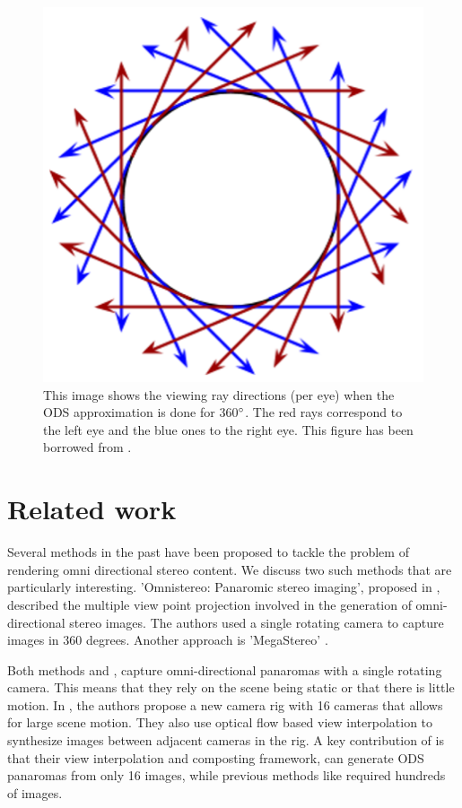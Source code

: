 \documentclass[10pt,twocolumn,letterpaper]{article}
\begin{document}
\begin{figure}[t]
\begin{center}
   \includegraphics[width=0.5\linewidth]{pictures/ods.png}
\end{center}
   \caption{This image shows the viewing ray directions (per eye) when the ODS approximation is done for 360$\degree$. The red rays correspond to the left eye and the blue ones to the right eye. This figure has been borrowed from \cite{ods}.}
\label{ods}
\end{figure}


\section{Related work}
\label{related-work}
Several methods in the past have been proposed to tackle the problem of rendering omni directional stereo content. We discuss two such methods that are particularly interesting. 'Omnistereo: Panaromic stereo imaging', proposed in \cite{peleg}, described the multiple view point projection involved in the generation of omni-directional stereo images. The authors used a single rotating camera to capture images in 360 degrees. Another approach is 'MegaStereo' \cite{megastereo}. 

Both methods \cite{peleg} and \cite{megastereo}, capture omni-directional panaromas with a single rotating camera. This means that they rely on the scene being static or that there is little motion. In \cite{jump16}, the authors propose a new camera rig with 16 cameras that allows for large scene motion. They also use optical flow based view interpolation to synthesize images between adjacent cameras in the rig. A key contribution of \cite{jump16} is that their view interpolation and composting framework, can generate ODS panaromas from only 16 images, while previous methods like \cite{megastereo} required hundreds of images. 
\end{document}
